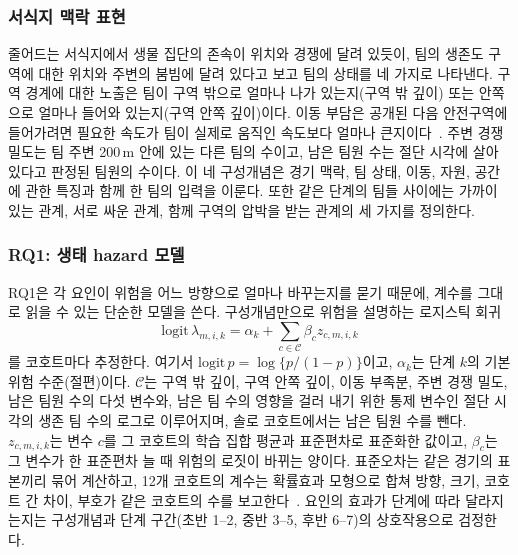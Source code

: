 \subsubsection{서식지 맥락 표현}
\label{sec:method:representation}
줄어드는 서식지에서 생물 집단의 존속이 위치와 경쟁에 달려 있듯이, 팀의 생존도 구역에 대한 위치와 주변의 붐빔에 달려 있다고 보고 팀의 상태를 네 가지로 나타낸다.
구역 경계에 대한 노출은 팀이 구역 밖으로 얼마나 나가 있는지(구역 밖 깊이) 또는 안쪽으로 얼마나 들어와 있는지(구역 안쪽 깊이)이다.
이동 부담은 공개된 다음 안전구역에 들어가려면 필요한 속도가 팀이 실제로 움직인 속도보다 얼마나 큰지이다~\cite{Nathan08}.
주변 경쟁 밀도는 팀 주변 200\,m 안에 있는 다른 팀의 수이고, 남은 팀원 수는 절단 시각에 살아 있다고 판정된 팀원의 수이다.
이 네 구성개념은 경기 맥락, 팀 상태, 이동, 자원, 공간에 관한 특징과 함께 한 팀의 입력을 이룬다.
또한 같은 단계의 팀들 사이에는 가까이 있는 관계, 서로 싸운 관계, 함께 구역의 압박을 받는 관계의 세 가지를 정의한다.

\subsubsection{RQ1: 생태 hazard 모델}
\label{sec:method:rq1}
RQ1은 각 요인이 위험을 어느 방향으로 얼마나 바꾸는지를 묻기 때문에, 계수를 그대로 읽을 수 있는 단순한 모델을 쓴다.
구성개념만으로 위험을 설명하는 로지스틱 회귀
\begin{equation}
\mathrm{logit}\,\lambda_{m,i,k}=\alpha_k+\textstyle\sum_{c\in\mathcal{C}}\beta_c z_{c,m,i,k}
\label{eq:ehm}
\end{equation}
를 코호트마다 추정한다.
여기서 $\mathrm{logit}\,p=\log\{p/(1-p)\}$이고, $\alpha_k$는 단계 $k$의 기본 위험 수준(절편)이다.
$\mathcal{C}$는 구역 밖 깊이, 구역 안쪽 깊이, 이동 부족분, 주변 경쟁 밀도, 남은 팀원 수의 다섯 변수와, 남은 팀 수의 영향을 걸러 내기 위한 통제 변수인 절단 시각의 생존 팀 수의 로그로 이루어지며, 솔로 코호트에서는 남은 팀원 수를 뺀다.
$z_{c,m,i,k}$는 변수 $c$를 그 코호트의 학습 집합 평균과 표준편차로 표준화한 값이고, $\beta_c$는 그 변수가 한 표준편차 늘 때 위험의 로짓이 바뀌는 양이다.
표준오차는 같은 경기의 표본끼리 묶어 계산하고, 12개 코호트의 계수는 확률효과 모형으로 합쳐 방향, 크기, 코호트 간 차이, 부호가 같은 코호트의 수를 보고한다~\cite{DerSimonian86}.
요인의 효과가 단계에 따라 달라지는지는 구성개념과 단계 구간(초반 1--2, 중반 3--5, 후반 6--7)의 상호작용으로 검정한다.

